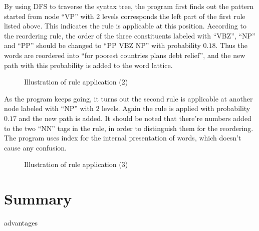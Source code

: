 By using DFS to traverse the syntax tree, the program first finds out the pattern started from node ``VP'' with $2$ levels corresponds the left part of the first rule listed above. This indicates the rule is applicable at this position. According to the reordering rule, the order of the three constituents labeled with ``VBZ'', ``NP'' and ``PP'' should be changed to ``PP VBZ NP'' with probability $0.18$. Thus the words are reordered into ``for poorest countries plans debt relief'', and the new path with this probability is added to the word lattice.

\begin{figure}[H]
\centering
\subfigure{

}
\subfigure{

}
\caption{Illustration of rule application (2)}
\end{figure}

As the program keeps going, it turns out the second rule is applicable at another node labeled with ``NP'' with $2$ levels. Again the rule is applied with probability $0.17$ and the new path is added. It should be noted that there're numbers added to the two ``NN'' tags in the rule, in order to distinguish them for the reordering. The program uses index for the internal presentation of words, which doesn't cause any confusion.

\begin{figure}[H]
\centering
\subfigure{

}
\subfigure{

}
\caption{Illustration of rule application (3)}
\end{figure}

\section{Summary}

advantages